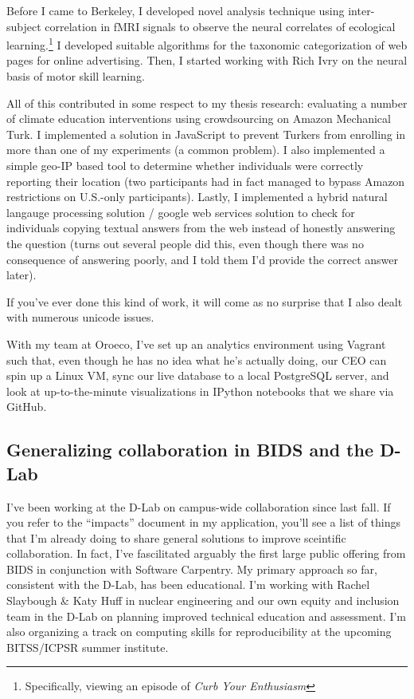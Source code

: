 Before I came to Berkeley, I developed novel analysis technique using
inter-subject correlation in fMRI signals to observe the neural correlates of
ecological learning.\footnote{Specifically, viewing an episode of \emph{Curb
Your Enthusiasm}} I developed suitable algorithms for the taxonomic
categorization of web pages for online advertising. Then, I started working with
Rich Ivry on the neural basis of motor skill learning.

All of this contributed in some respect to my thesis research: evaluating a
number of climate education interventions using crowdsourcing on Amazon
Mechanical Turk. I implemented a solution in JavaScript to prevent Turkers from
enrolling in more than one of my experiments (a common problem). %
I also implemented a simple geo-IP based tool to determine whether individuals
were correctly reporting their location (two participants had in fact managed to
bypass Amazon restrictions on U.S.-only participants). Lastly, I implemented a
hybrid natural langauge processing solution / google web services solution to
check for individuals copying textual answers from the web instead of honestly
answering the question (turns out several people did this, even though there was
no consequence of answering poorly, and I told them I'd provide the correct
answer later).

If you've ever done this kind of work, it will come as no surprise that I also
dealt with numerous unicode issues.

With my team at Oroeco, I've set up an analytics environment using Vagrant such
that, even though he has no idea what he's actually doing, our CEO can spin up a
Linux VM, sync our live database to a local PostgreSQL server, and look at
up-to-the-minute visualizations in IPython notebooks that we share via GitHub.


\subsection*{Generalizing collaboration in BIDS and the D-Lab}

I've been working at the D-Lab on campus-wide collaboration since last fall. If
you refer to the “impacts” document in my application, you'll see a list of
things that I'm already doing to share general solutions to improve sceintific
collaboration. In fact, I've fascilitated arguably the first large public
offering from BIDS in conjunction with Software Carpentry. My primary approach
so far, consistent with the D-Lab, has been educational. I'm working with Rachel
Slaybough \& Katy Huff in nuclear engineering and our own equity and inclusion
team in the D-Lab on planning improved technical education and assessment. I'm
also organizing a track on computing skills for reproducibility at the upcoming
BITSS/ICPSR summer institute.

